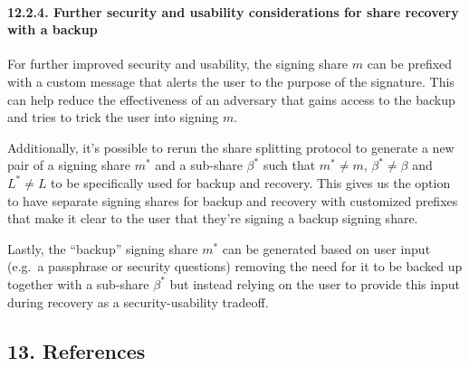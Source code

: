 \documentclass[
]{article}
\begin{document}
\hypertarget{share-recovery-backup-enhancements}{%
\paragraph{12.2.4. Further security and usability considerations for
share recovery with a backup}\label{share-recovery-backup-enhancements}}

For further improved security and usability, the signing share \(m\) can
be prefixed with a custom message that alerts the user to the purpose of
the signature. This can help reduce the effectiveness of an adversary
that gains access to the backup and tries to trick the user into signing
\(m\).

Additionally, it's possible to rerun the share splitting protocol to
generate a new pair of a signing share \(m^ \ast\) and a sub-share
\(\beta ^ \ast\) such that \(m^ \ast \neq m\),
\(\beta ^ \ast \neq \beta\) and \(L^ \ast \neq L\) to be specifically
used for backup and recovery. This gives us the option to have separate
signing shares for backup and recovery with customized prefixes that
make it clear to the user that they're signing a backup signing share.

Lastly, the ``backup'' signing share \(m^ \ast\) can be generated based
on user input (e.g.~a passphrase or security questions) removing the
need for it to be backed up together with a sub-share \(\beta ^ \ast\)
but instead relying on the user to provide this input during recovery as
a security-usability tradeoff.

\hypertarget{references}{%
\subsection{13. References}\label{references}}
\end{document}
